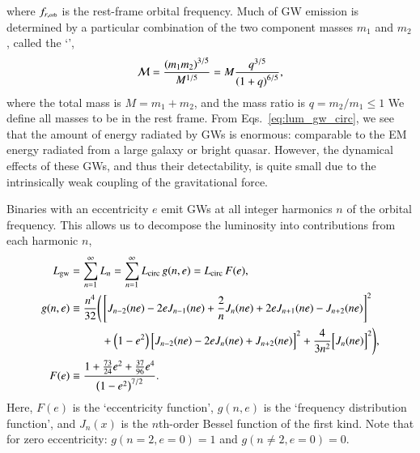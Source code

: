 \documentclass[onecolumn,authoryear]{els-mrw}
\begin{document}
where $\frstorb$ is the rest-frame orbital frequency.  Much of GW emission is determined by a particular combination of the two component masses $m_1$ and $m_2$, called the `',
\begin{align}
    \label{eq:chirp_mass}
    \mathcal{M} = \frac{\left(m_1 m_2\right)^{3/5}}{M^{1/5}} = M \frac{q^{3/5}}{\left(1 + q\right)^{6/5}},
\end{align}
where the total mass is $M = m_1 + m_2$, and the mass ratio is $q = m_2/m_1 \leq 1$  We define all masses to be in the rest frame.  From Eqs.~\ref{eq:lum_gw_circ}, we see that the amount of energy radiated by GWs is enormous: comparable to the EM energy radiated from a large galaxy or bright quasar.  However, the dynamical effects of these GWs, and thus their detectability, is quite small due to the intrinsically weak coupling of the gravitational force.

Binaries with an eccentricity $e$ emit GWs at all integer harmonics $n$ of the orbital frequency.  This allows us to decompose the luminosity into contributions from each harmonic $n$,
\begin{subequations}
\begin{align}
    \lumgw & = \sum_{n=1}^\infty L_n = \sum_{n=1}^\infty \lgwcirc \, g(n,e) = \lgwcirc \, F(e), \\
    g(n,e) & \equiv \frac{n^4}{32} \Biggl(
        \begin{aligned}[t]
            & \left[ J_{n-2}(ne) - 2eJ_{n-1}(ne) + \frac{2}{n} J_n (ne) + 2e J_{n+1} (ne) - J_{n+2} (ne) \vphantom{\frac{2}{n}}\right]^2 \\
            & + \left(1-e^2\right) \Bigl[J_{n-2}(ne) - 2eJ_n(ne) + J_{n+2}(ne)\Bigr]^2 + \frac{4}{3n^2}\Bigl[J_n(ne)\Bigr]^2 \Biggr),
        \end{aligned} \\
    F(e) & \equiv \frac{1 + \frac{73}{24} e^2 + \frac{37}{96} e^4}{\left( 1 - e^2\right)^{7/2}}.
\end{align}
\end{subequations}
Here, $F(e)$ is the `eccentricity function', $g(n,e)$ is the `frequency distribution function', and $J_n(x)$ is the $n$th-order Bessel function of the first kind.  Note that for zero eccentricity: $g(n\!=\!2,e\!=\!0) = 1$ and $g(n\!\neq\!2, e\!=\!0) = 0$.
\end{document}
